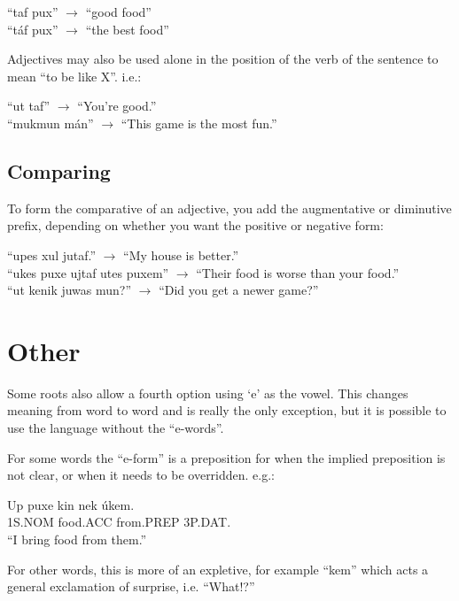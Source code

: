 \documentclass{book}
\begin{document}
\begin{center}
    ``taf pux'' $\rightarrow$ ``good food'' \\
    ``táf pux'' $\rightarrow$ ``the best food''
\end{center}

Adjectives may also be used alone in the position of the verb of the sentence to mean ``to be like X''. i.e.:

\begin{center}
    ``ut taf'' $\rightarrow$ ``You're good.'' \\
    ``mukmun mán'' $\rightarrow$ ``This game is the most fun.''
\end{center}

\subsection{Comparing}
To form the comparative of an adjective, you add the augmentative or diminutive prefix, depending
on whether you want the positive or negative form:

\begin{center}
    ``upes xul jutaf.'' $\rightarrow$ ``My house is better.'' \\
    ``ukes puxe ujtaf utes puxem'' $\rightarrow$ ``Their food is worse than your food.'' \\
    ``ut kenik juwas mun?'' $\rightarrow$ ``Did you get a newer game?''
\end{center}


\section{Other}
Some roots also allow a fourth option using `e' as the vowel. This changes meaning from word to word
and is really the only exception, but it is possible to use the language without the ``e-words''.

For some words the ``e-form'' is a preposition for when the implied preposition is not clear, or when
it needs to be overridden. e.g.:

\begin{exe}
    \ex
    \gll Up puxe kin nek úkem.\\
    1S.NOM food.ACC from.PREP 3P.DAT. \\
    \glt ``I bring food from them.''
\end{exe}

For other words, this is more of an expletive, for example ``kem'' which acts a general exclamation
of surprise, i.e. ``What!?''
\end{document}
